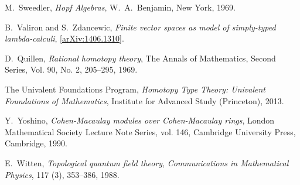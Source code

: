 \documentclass[english,letter paper,12pt,reqno]{article}
\theoremstyle{example}
\numberwithin{equation}{section}
\begin{document}
\begin{thebibliography}{BHLS03}
M.~Sweedler, \textsl{Hopf Algebras}, W.~A.~Benjamin, New York, 1969.

B.~Valiron and S.~Zdancewic, \textsl{Finite vector spaces as model of simply-typed lambda-calculi}, \href{http://arxiv.org/abs/1406.1310v1}{[arXiv:1406.1310]}.

D.~Quillen, \textsl{Rational homotopy theory}, The Annals of Mathematics, Second Series, Vol. 90, No. 2, 205--295, 1969.

The Univalent Foundations Program, \textsl{Homotopy {T}ype {T}heory: {U}nivalent {F}oundations of {M}athematics}, Institute for Advanced Study (Princeton), 2013.

Y.~Yoshino, \emph{Cohen-{M}acaulay modules over {C}ohen-{M}acaulay rings},
  London Mathematical Society Lecture Note Series, vol. 146, Cambridge
  University Press, Cambridge, 1990. 
  
E.~Witten, \textsl{Topological quantum field theory}, \textsl{Communications in Mathematical Physics}, 117 (3), 353--386, 1988.

\end{thebibliography}
\end{document}
